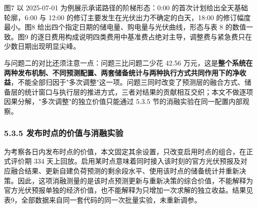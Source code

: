 \documentclass[12pt,a4paper]{ctexart}
\begin{document}
图7 以 2025-07-01 为例展示承诺路径的阶梯形态：0:00 的首次计划给出全天基础轮廓，6:00 与 12:00 的修订主要发生在光伏出力不确定的白天，18:00 的修订幅度最小。图8 给出四个指定日期的储电量、购电量与光伏曲线，形态与表 8 的数值一致。图9 的逐日费用构成说明四类费用中基准费占绝对主导，调整费与紧急费只在少数日期出现明显尖峰。

与问题二的对比还须注意一点：问题三比问题二少花 42.56 万元，这是\textbf{整个系统在两种发布机制、不同预测配置、两套储备统计与两种执行方式共同作用下的净收益}，不能全部归因于"多次调整"这一项。问题三同时改变了预测层的融合方式、储备层的统计窗口与执行层的推进方式，三者对结果的贡献相互交织；本文不做逐项因果分解，"多次调整"的独立价值只能通过 5.3.5 节的消融实验在同一配置内部观察。

\subsubsection*{5.3.5 发布时点的价值与消融实验}

为考察各日内发布时点的价值，本文固定其余设置，只改变启用时点的组合，在正式评价期 334 天上回放。启用某时点意味着同时接入该时刻的官方光伏预报及对应融合结果、更新自建负荷预测的剩余段水平、使用该时点的储备统计并重新决策。因此，这项消融测量的是该时点预测更新与重新决策的综合价值，不能解释为官方光伏预报单独的经济价值，也不能解释为只增加一次求解的独立收益。结果见表9，全部数据来自同一套代码的同一次批量实验，未重新调参。
\end{document}
